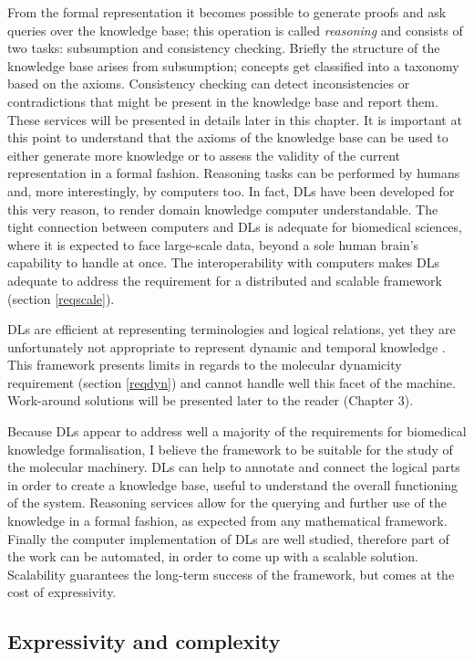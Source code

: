 From the formal representation it becomes possible to generate proofs and ask queries over the knowledge base; this operation is called \emph{reasoning} and consists of two tasks: subsumption and consistency checking. Briefly the structure of the knowledge base arises from subsumption; concepts get classified into a taxonomy based on the axioms. Consistency checking can detect inconsistencies or contradictions that might be present in the knowledge base and report them. These services will be presented in details later in this chapter. It is important at this point to understand that the axioms of the knowledge base can be used to either generate more knowledge or to assess the validity of the current representation in a formal fashion. Reasoning tasks can be performed by humans and, more interestingly, by computers too. In fact, DLs have been developed for this very reason, to render domain knowledge computer understandable. The tight connection between computers and DLs is adequate for biomedical sciences, where it is expected to face large-scale data, beyond a sole human brain's capability to handle at once. The interoperability with computers makes DLs adequate to address the requirement for a distributed and scalable framework (section \ref{reqscale}).

DLs are efficient at representing terminologies and logical relations, yet they are unfortunately not appropriate to represent dynamic and temporal knowledge \citep{kim2008temporal}. This framework presents limits in regards to the molecular dynamicity requirement (section \ref{reqdyn}) and cannot handle well this facet of the machine. Work-around solutions will be presented later to the reader (Chapter 3).

Because DLs appear to address well a majority of the requirements for biomedical knowledge formalisation, I believe the framework to be suitable for the study of the molecular machinery. DLs can help to annotate and connect the logical parts in order to create a knowledge base, useful to understand the overall functioning of the system. Reasoning services allow for the querying and further use of the knowledge in a formal fashion, as expected from any mathematical framework. Finally the computer implementation of DLs are well studied, therefore part of the work can be automated, in order to come up with a scalable solution. Scalability guarantees the long-term success of the framework, but comes at the cost of expressivity.

\subsection{Expressivity and complexity}
\label{complexity}

